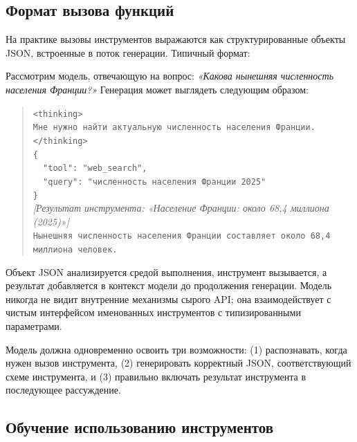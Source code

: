 \subsection{Формат вызова функций}
\label{subsec:function-calling-format}

На практике вызовы инструментов выражаются как структурированные объекты JSON,
встроенные в поток генерации. Типичный формат:

\begin{example}
\label{ex:tool-call-json}
Рассмотрим модель, отвечающую на вопрос: \emph{«Какова нынешняя численность населения
Франции?»} Генерация может выглядеть следующим образом:

\begin{quote}
\small
\texttt{<thinking>}\\
\texttt{Мне нужно найти актуальную численность населения Франции.}\\
\texttt{</thinking>}\\[0.3em]
\texttt{\{}\\
\texttt{\ \ "tool": "web\_search",}\\
\texttt{\ \ "query": "численность населения Франции 2025"}\\
\texttt{\}}\\[0.3em]
\textit{[Результат инструмента: «Население Франции: около 68,4 миллиона (2025)»]}\\[0.3em]
\texttt{Нынешняя численность населения Франции составляет около 68,4 миллиона человек.}
\end{quote}

Объект JSON анализируется средой выполнения, инструмент
вызывается, а результат добавляется в контекст модели до
продолжения генерации. Модель никогда не видит внутренние механизмы сырого API; она
взаимодействует с чистым интерфейсом именованных инструментов с типизированными параметрами.
\end{example}

Модель должна одновременно освоить три возможности: (1) распознавать,
когда нужен вызов инструмента, (2) генерировать корректный JSON,
соответствующий схеме инструмента, и (3) правильно включать
результат инструмента в последующее рассуждение.

\subsection{Обучение использованию инструментов}
\label{subsec:training-tool-use}

